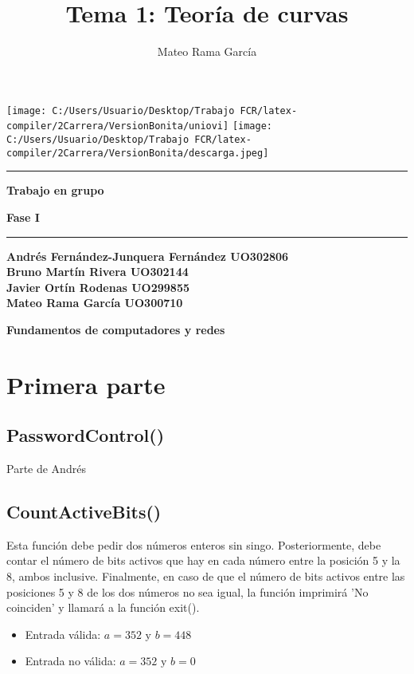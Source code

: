 \documentclass[11pt,a4paper]{article}
\title{\textbf{Tema 1: } Teoría de curvas}
\author{Mateo Rama García}
\begin{document}
  
\begin{titlepage}
  \centering  
  \vspace*{1cm}  %
  \texttt{[image: C:/Users/Usuario/Desktop/Trabajo FCR/latex-compiler/2Carrera/VersionBonita/uniovi]} \hspace{2cm}
  \texttt{[image: C:/Users/Usuario/Desktop/Trabajo FCR/latex-compiler/2Carrera/VersionBonita/descarga.jpeg]} \\[1cm] 
  \vspace{\fill}%
  \hrule
  \vspace{0.5cm}
  {\Huge \bfseries Trabajo en grupo\par}
  \vspace{0.5cm}
  {\Large \bfseries Fase I\par}
  \vspace{0.5cm}
  \hrule
  \vspace{1cm}
  {\bfseries Andrés Fernández-Junquera Fernández UO302806\\[3ex]
  Bruno Martín Rivera UO302144\\[3ex]
  Javier Ortín Rodenas UO299855\\[3ex]
  Mateo Rama García UO300710\par} %
  \vspace{\fill}  %
  {\Large \textbf{Fundamentos de computadores y redes}\par}
\end{titlepage}



\newpage

\tableofcontents

\newpage


\section{Primera parte}
\subsection{PasswordControl()}
Parte de Andrés
\subsection{CountActiveBits()}
Esta función debe pedir dos números enteros sin singo. Posteriormente, debe contar el número de bits activos
que hay en cada número entre la posición 5 y la 8, ambos inclusive. Finalmente, en caso de que el 
número de bits activos entre las posiciones 5 y 8 de los dos números   no sea igual, la función 
imprimirá 'No coinciden' y llamará a la función exit().
\begin{itemize}
  \item Entrada válida: \(a = 352 \text{ y } b = 448\)
  \item Entrada no válida: \(a = 352 \text{ y } b = 0\)
\end{itemize}
\end{document}
